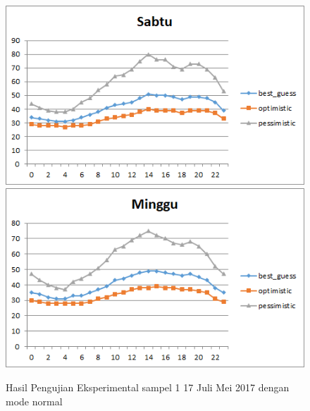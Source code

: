 \begin{figure}[H]
				\centering	
				\includegraphics[]{Gambar/sabtusampel117072017normal.png}
				\includegraphics[]{Gambar/minggusampel117072017normal.png}
				\caption[Hasil Pengujian Eksperimental]{Hasil Pengujian Eksperimental sampel 1 17 Juli Mei 2017 dengan mode normal}
				\label{fig:eksperimentalsampel117072017normal}
\end{figure}

\newpage
				
